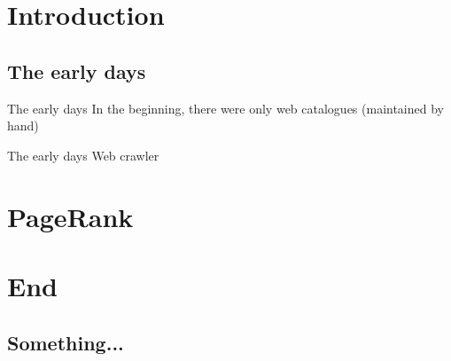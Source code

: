 \documentclass[usepdftitle=false,hyperref={pdfpagelabels=false}]{beamer}
\begin{document}
\title{\titleText}
\subtitle{History, Algorithm}
\author{\tutor}
\date{\today}
\subject{Programmieren}

\frame{\titlepage}



\section{Introduction}
\subsection{The early days}
\begin{frame}{The early days}
    In the beginning, there were only web catalogues (maintained by hand)
\end{frame}

\begin{frame}{The early days}
    Web crawler
\end{frame}

\section{PageRank}


\section{End}
\subsection{Something...}
\end{document}
